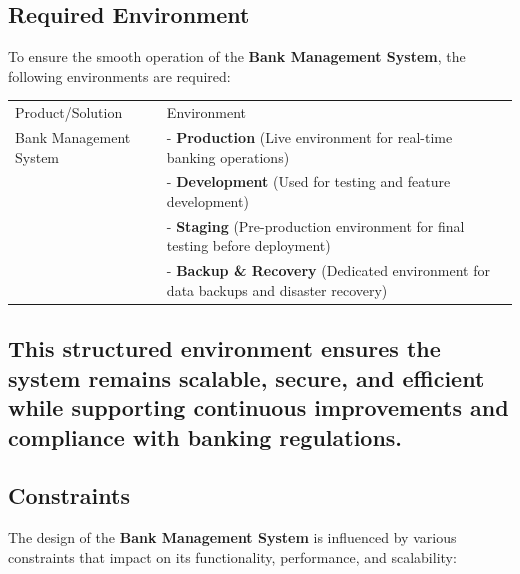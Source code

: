 \subsection{Required Environment}\label{required-environment}

To ensure the smooth operation of the \textbf{Bank Management System},
the following environments are required:

\begin{longtable}[]{@{}
  >{\raggedright\arraybackslash}p{}
  >{\raggedright\arraybackslash}p{}@{}}
\toprule\noalign{}
\endhead
\bottomrule\noalign{}
\endlastfoot
Product/Solution & Environment \\
Bank Management System & - \textbf{Production} (Live environment for
real-time banking operations) \\
& - \textbf{Development} (Used for testing and feature development) \\
& - \textbf{Staging} (Pre-production environment for final testing
before deployment) \\
& - \textbf{Backup \& Recovery} (Dedicated environment for data backups
and disaster recovery) \\
\end{longtable}

\subsection{This structured environment ensures the system remains
scalable, secure, and efficient while supporting continuous improvements
and compliance with banking
regulations.}\label{this-structured-environment-ensures-the-system-remains-scalable-secure-and-efficient-while-supporting-continuous-improvements-and-compliance-with-banking-regulations.}

\subsection{Constraints}\label{constraints}

\protect{}\label{Xfce2f82cfd63ce3cc56ff7cd87639809d1de288}{}The
design of the \textbf{Bank Management System} is influenced by various
constraints that impact on its functionality, performance, and
scalability:

